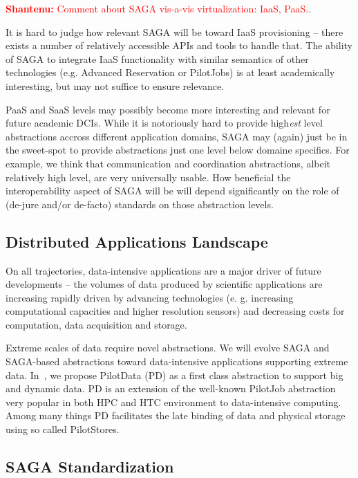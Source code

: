 \documentclass{article}
\newcommand{\I}[1]{\textit{#1}}
\newcommand{\B}[1]{\textbf{#1}}
\newcommand{\jhanote}[1]{{\textcolor{red}{     \B{Shantenu:} #1 }}}
\newcommand{\jhanote}[1]{}
\begin{document}
  \jhanote{Comment about SAGA vis-a-vis virtualization: IaaS, PaaS..}

  It is hard to judge how relevant SAGA will be toward IaaS
  provisioning -- there exists a number of relatively accessible APIs
  and tools to handle that.  The ability of SAGA to integrate IaaS
  functionality with similar semantics of other technologies
  (e.g. Advanced Reservation or PilotJobs) is at least academically
  interesting, but may not suffice to ensure relevance.

  PaaS and SaaS levels may possibly become more interesting and
  relevant for future academic DCIs.  While it is notoriously hard to
  provide high\I{est} level abstractions accross different application
  domains, SAGA may (again) just be in the sweet-spot to provide
  abstractions just one level below domaine specifics.  For example,
  we think that communication and coordination abstractions, albeit
  relatively high level, are very universally usable.  How beneficial
  the interoperability aspect of SAGA will be will depend
  significantly on the role of (de-jure and/or de-facto) standards on
  those abstraction levels.


 \subsection{Distributed Applications Landscape}
 
  On all trajectories, data-intensive applications are a major driver of
  future developments -- the volumes of data produced by scientific
  applications are increasing rapidly driven by advancing technologies
  (e. g. increasing computational capacities and higher resolution
  sensors) and decreasing costs for computation, data acquisition and
  storage.

  Extreme scales of data require novel abstractions. We will evolve SAGA
  and SAGA-based abstractions toward data-intensive applications
  supporting extreme data.  In~\cite{troy-2011}, we propose PilotData
  (PD) as a first class abstraction to support big and dynamic data. PD
  is an extension of the well-known PilotJob abstraction very popular in
  both HPC and HTC environment to data-intensive computing.  Among many
  things PD facilitates the late binding of data and physical storage
  using so called PilotStores.

 \subsection{SAGA Standardization}
\end{document}

